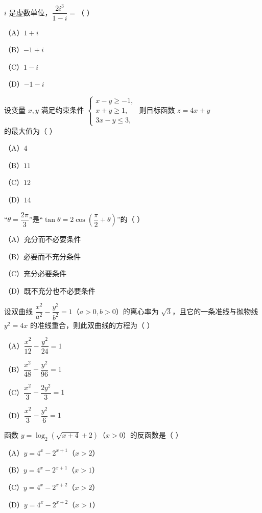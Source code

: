 


\begin{question}
$i$ 是虚数单位，$\dfrac{2i^3}{1-i}=$（ ）

（A）$1+i$

（B）$-1+i$

（C）$1-i$

（D）$-1-i$

\end{question}
\begin{question}
设变量 $x,y$ 满足约束条件 $\begin{cases}x-y\geqslant -1,\\ x+y\geqslant 1,\\ 3x-y\leqslant 3,\end{cases}$ 则目标函数 $z=4x+y$ 的最大值为（ ）

（A）$4$

（B）$11$

（C）$12$

（D）$14$

\end{question}
\begin{question}
“$\theta=\dfrac{2\pi}{3}$”是“$\tan\theta=2\cos\left(\dfrac{\pi}{2}+\theta\right)$”的（ ）

（A）充分而不必要条件

（B）必要而不充分条件

（C）充分必要条件

（D）既不充分也不必要条件

\end{question}
\begin{question}
设双曲线 $\dfrac{x^2}{a^2}-\dfrac{y^2}{b^2}=1$（$a>0,b>0$）的离心率为 $\sqrt{3}$，且它的一条准线与抛物线 $y^2=4x$ 的准线重合，则此双曲线的方程为（ ）

（A）$\dfrac{x^2}{12}-\dfrac{y^2}{24}=1$

（B）$\dfrac{x^2}{48}-\dfrac{y^2}{96}=1$

（C）$\dfrac{x^2}{3}-\dfrac{2y^2}{3}=1$

（D）$\dfrac{x^2}{3}-\dfrac{y^2}{6}=1$

\end{question}
\begin{question}
函数 $y=\log_2(\sqrt{x+4}+2)$（$x>0$）的反函数是（ ）

（A）$y=4^x-2^{x+1}$（$x>2$）

（B）$y=4^x-2^{x+1}$（$x>1$）

（C）$y=4^x-2^{x+2}$（$x>2$）

（D）$y=4^x-2^{x+2}$（$x>1$）

\end{question}
